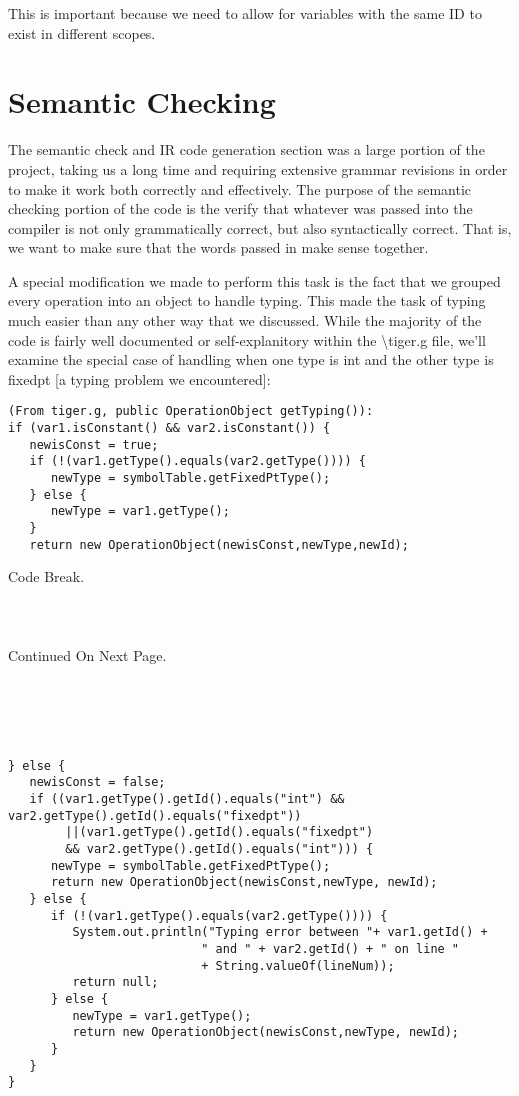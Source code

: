 \documentclass[a4paper]{article}
\begin{document}
This is important because we need to allow for variables with the same ID to exist in different scopes.
\section{Semantic Checking}
The semantic check and IR code generation section was a large portion of the project, taking us a long time and requiring extensive grammar revisions in order to make it work both correctly and effectively. The purpose of the semantic checking portion of the code is the verify that whatever was passed into the compiler is not only grammatically correct, but also syntactically correct. That is, we want to make sure that the words passed in make sense together.

A special modification we made to perform this task is the fact that we grouped every operation into an object to handle typing. This made the task of typing much easier than any other way that we discussed. While the majority of the code is fairly well documented or self-explanitory within the \textbackslash tiger.g file, we'll examine the special case of handling when one type is int and the other type is fixedpt [a typing problem we encountered]:

\begin{verbatim}
(From tiger.g, public OperationObject getTyping()):
if (var1.isConstant() && var2.isConstant()) {
   newisConst = true;
   if (!(var1.getType().equals(var2.getType()))) {
      newType = symbolTable.getFixedPtType();
   } else {
      newType = var1.getType();
   }
   return new OperationObject(newisConst,newType,newId);
\end{verbatim}

Code Break. \\ \\ \\ \\ Continued On Next Page.  \\ \\ \\ \\ \\

\begin{verbatim}
} else {
   newisConst = false;
   if ((var1.getType().getId().equals("int") && var2.getType().getId().equals("fixedpt"))
        ||(var1.getType().getId().equals("fixedpt") 
        && var2.getType().getId().equals("int"))) {
      newType = symbolTable.getFixedPtType();
      return new OperationObject(newisConst,newType, newId);
   } else {
      if (!(var1.getType().equals(var2.getType()))) {
         System.out.println("Typing error between "+ var1.getId() + 
                           " and " + var2.getId() + " on line "
                           + String.valueOf(lineNum));
         return null;
      } else {
         newType = var1.getType();
         return new OperationObject(newisConst,newType, newId);
      }
   }
}
\end{verbatim}
\end{document}
